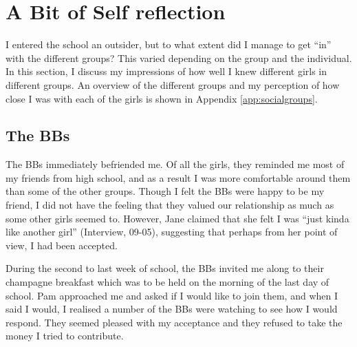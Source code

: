   


\section{A Bit of Self reflection}

I entered the school an outsider, but to what extent did I manage to get ``in'' with the different groups?  This varied depending on the group and the individual.  In this section, I discuss my impressions of how well I knew different girls in different groups.  An overview of the different groups and my perception of how close I was with each of the girls is shown in Appendix \ref{app:socialgroups}.

\subsection{The BBs}
The BBs immediately befriended me.  Of all the girls, they reminded me most of my friends from high school, and as a result I was more comfortable around them than some of the other groups.  Though I felt the BBs were happy to be my friend, I did not have the feeling that they valued our relationship as much as some other girls seemed to.  However, Jane claimed that she felt I was ``just kinda like another girl'' (Interview, 09-05), suggesting that perhaps from her point of view, I had been accepted.

During the second to last week of school, the BBs invited me along to their champagne breakfast which was to be held on the morning of the last day of school.  Pam approached me and asked if I would like to join them, and when I said I would, I realised a number of the BBs were watching to see how I would respond.  They seemed pleased with my acceptance and they refused to take the money I tried to contribute.  

